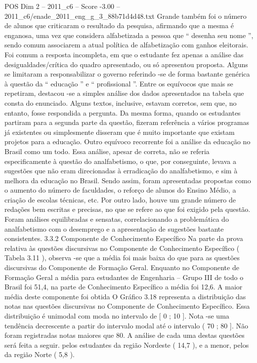 \begin{textsample}{POS Dim 2 – 2011\_c6 – Score -3.00 – 2011\_c6/enade\_2011\_eng\_g\_3\_88b71d4d48.txt}
Grande também foi o número de alunos que criticaram o resultado da pesquisa, afirmando que a mesma é enganosa, uma vez que considera alfabetizada a pessoa que “ desenha seu nome ”, sendo comum associarem a atual política de alfabetização com ganhos eleitorais.
Foi comum a resposta incompleta, em que o estudante fez apenas a análise das desigualdades/crítica do quadro apresentado, ou só apresentou proposta.
Alguns se limitaram a responsabilizar o governo referindo -se de forma bastante genérica à questão da “ educação ” e “ profissional ”.
Entre os equívocos que mais se repetiram, destacou -se a simples análise dos dados apresentados na tabela que consta do enunciado.
Alguns textos, inclusive, estavam corretos, sem que, no entanto, fosse respondida a pergunta.
Da mesma forma, quando os estudantes partiram para a segunda parte da questão, fizeram referência a vários programas já existentes ou simplesmente disseram que é muito importante que existam projetos para a educação.
Outro equívoco recorrente foi a análise da educação no Brasil como um todo.
Essa análise, apesar de correta, não se referia especificamente à questão do analfabetismo, o que, por conseguinte, levava a sugestões que não eram direcionadas à erradicação do analfabetismo, e sim à melhora da educação no Brasil.
Sendo assim, foram apresentadas propostas como o aumento do número de faculdades, o reforço de alunos do Ensino Médio, a criação de escolas técnicas, etc.
Por outro lado, houve um grande número de redações bem escritas e precisas, no que se refere ao que foi exigido pela questão.
Foram análises equilibradas e sensatas, correlacionando a problemática do analfabetismo com o desemprego e a apresentação de sugestões bastante consistentes. 3.3.2 Componente de Conhecimento Específico Na parte da prova relativa às questões discursivas no Componente de Conhecimento Específico ( Tabela 3.11 ), observa -se que a média foi mais baixa do que para as questões discursivas do Componente de Formação Geral.
Enquanto no Componente de Formação Geral a média para estudantes de Engenharia – Grupo III de todo o Brasil foi 51,4, na parte de Conhecimento Específico a média foi 12,6.
A maior média deste componente foi obtida O Gráfico 3.18 representa a distribuição das notas nas questões discursivas no Componente de Conhecimento Específico.
Essa distribuição é unimodal com moda no intervalo de [ 0 ; 10 ].
Nota -se uma tendência decrescente a partir do intervalo modal até o intervalo ( 70 ; 80 ].
Não foram registradas notas maiores que 80.
A análise de cada uma destas questões será feita a seguir. pelos estudantes da região Nordeste ( 14,7 ), e a menor, pelos da região Norte ( 5,8 ).

\end{textsample}
